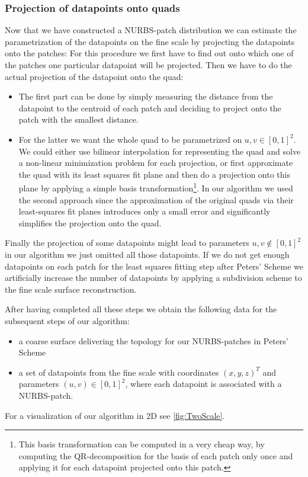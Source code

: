 \subsubsection{Projection of datapoints onto quads}
Now that we have constructed a \ac{NURBS}-patch distribution we can estimate the parametrization of the datapoints on the fine scale by projecting the datapoints onto the patches: For this procedure we first have to find out onto which one of the patches one particular datapoint will be projected. Then we have to do the actual projection of the datapoint onto the quad: 
\begin{itemize}
\item The first part can be done by simply measuring the distance from the datapoint to the centroid of each patch and deciding to project onto the patch with the smallest distance. 

\item For the latter we want the whole \ac{quad} to be parametrized on $u,v\in\left[0,1\right]^2$. We could either use bilinear interpolation for representing the quad and solve a non-linear minimization problem for each projection, or first approximate the quad with its least squares fit plane and then do a projection onto this plane by applying a simple basis transformation\footnote{This basis transformation can be computed in a very cheap way, by computing the QR-decomposition for the basis of each patch only once and applying it for each datapoint projected onto this patch.}. In our algorithm we used the second approach since the approximation of the original \acp{quad} via their least-squares fit planes introduces only a small error and significantly simplifies the projection onto the \ac{quad}.
\end{itemize}
Finally the projection of some datapoints might lead to parameters $u,v\not\in\left[0,1\right]^2$ in our algorithm we just omitted all those datapoints. If we do not get enough datapoints on each patch for the least squares fitting step after Peters' Scheme we artificially increase the number of datapoints by applying a subdivision scheme to the fine scale surface reconstruction.

After having completed all these steps we obtain the following data for the subsequent steps of our algorithm:
\begin{itemize}
\item a coarse surface delivering the topology for our \ac{NURBS}-patches in Peters' Scheme
\item a set of datapoints from the fine scale with coordinates $\left(x,y,z\right)^T$ and parameters $\left(u,v\right)\in\left[0,1\right]^2$, where each datapoint is associated with a \ac{NURBS}-patch. 
\end{itemize}
For a visualization of our algorithm in 2D see \autoref{fig:TwoScale}.

